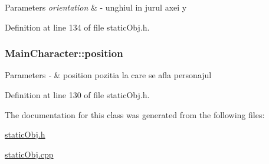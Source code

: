 \begin{DoxyParams}{Parameters}
{\em orientation} & -\/ unghiul in jurul axei y \\
\hline
\end{DoxyParams}


Definition at line 134 of file static\-Obj.\-h.

\hypertarget{class_main_character_ad8584e16c6e3f1b599fe9fad7511b14f}{
\subsubsection[{position}]{ Main\-Character\-::position}}\label{class_main_character_ad8584e16c6e3f1b599fe9fad7511b14f}

\begin{DoxyParams}{Parameters}
{\em -\/} & position pozitia la care se afla personajul \\
\hline
\end{DoxyParams}


Definition at line 130 of file static\-Obj.\-h.



The documentation for this class was generated from the following files\-:\begin{DoxyCompactItemize}
\item 
\hyperlink{static_obj_8h}{static\-Obj.\-h}\item 
\hyperlink{static_obj_8cpp}{static\-Obj.\-cpp}\end{DoxyCompactItemize}
